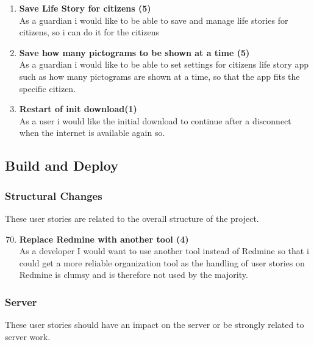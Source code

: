 \begin{enumerate}
	\item \textbf{Save Life Story for citizens (5)}\\
	As a guardian i would like to be able to save and manage life stories for citizens, so i can do it for the citizens
	
	\item \textbf{Save how many pictograms to be shown at a time (5)}\\
	As a guardian i would like to be able to set settings for citizens life story app such as how many pictograms are shown at a time, so that the app fits the specific citizen.
	
	\item \textbf{ Restart of init download(1)}\\
	As a user i would like the initial download to continue after a disconnect when the internet is available again so.
\end{enumerate}

\subsection{Build and Deploy}

\subsubsection{Structural Changes}
These user stories are related to the overall structure of the project.

\begin{enumerate}
	\setcounter{enumi}{69} %
	\item \textbf{Replace Redmine with another tool (4)}\\
	As a developer I would want to use another tool instead of Redmine so that i could get a more reliable organization tool as the handling of user stories on Redmine is clumsy and is therefore not used by the majority.
\end{enumerate}

\subsubsection{Server}
These user stories should have an impact on the server or be strongly related to server work.

